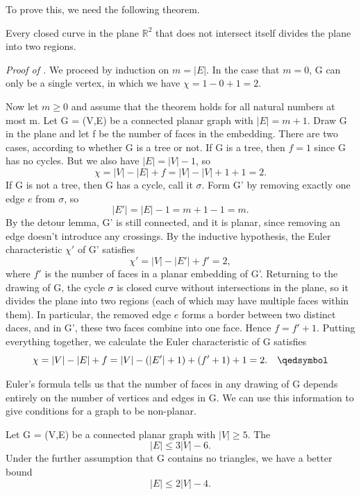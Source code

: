 \documentclass{tufte-handout}
\begin{document}
To prove this, we need the following theorem.

\begin{Theorem}
    Every closed curve in the plane \(\mathbb{R}^2 \) that does not intersect itself divides the plane into two regions.
\end{Theorem}

\textit{Proof of .} We proceed by induction on \( m = \left|E\right| \).
In the case that \( m=0 \), G can only be a single vertex, in which we have \( \chi = 1-0+1 = 2 \).

Now let \( m \geq 0 \) and assume that the theorem holds for all natural numbers at most m.
Let G = (V,E) be a connected planar graph with \(\left|E\right| = m+1\).
Draw G in the plane and let f be the number of faces in the embedding.
There are two cases, according to whether G is a tree or not.
If G is a tree, then \( f =1\) since G has no cycles. But we also have \(\left|E\right| = \left|V\right| - 1\), so
\[\chi = \left|V\right| - \left|E\right| + f = \left|V\right| - \left|V\right| + 1 + 1 = 2.\]
If G is not a tree, then G has a cycle, call it \(\sigma\). Form G' by removing exactly one edge \( e \) from \(\sigma\), so
\[\left|E'\right| = \left|E\right| - 1 = m + 1 - 1 = m.\]
By the detour lemma, G' is still connected, and it is planar, since removing an edge doesn't introduce any crossings.
By the inductive hypothesis, the Euler characteristic \( \chi' \) of G' satisfies
\[\chi' = \left|V\right| - \left|E'\right| + f' = 2,\]
where \( f' \) is the number of faces in a planar embedding of G'.
Returning to the drawing of G, the cycle \(\sigma\) is closed curve without intersections in the plane, so it divides
the plane into two regions (each of which may have multiple faces within them).
In particular, the removed edge \( e \) forms a border between two distinct daces, and in G',
these two faces combine into one face. Hence \( f = f' + 1 \).
Putting everything together, we calculate the Euler characteristic of G satisfies
\[\chi = \left|V\right| - \left|E\right| + f = \left|V\right| - (\left|E'\right|+1) + (f'+1) + 1 = 2.\quad \qedsymbol\]

Euler's formula tells us that the number of faces in any drawing of G depends entirely on
the number of vertices and edges in G. We can use this information to give conditions for a graph to be non-planar.

\begin{Theorem}
    \label{thm:nonplanar_bound}
    Let G = (V,E) be a connected planar graph with \( \left|V\right| \geq 5 \). The
    \[\left|E\right| \leq 3\left|V\right| - 6.\]
    Under the further assumption that G contains no triangles, we have a better bound
    \[\left|E\right| \leq 2\left|V\right| - 4.\]
\end{Theorem}
\end{document}
